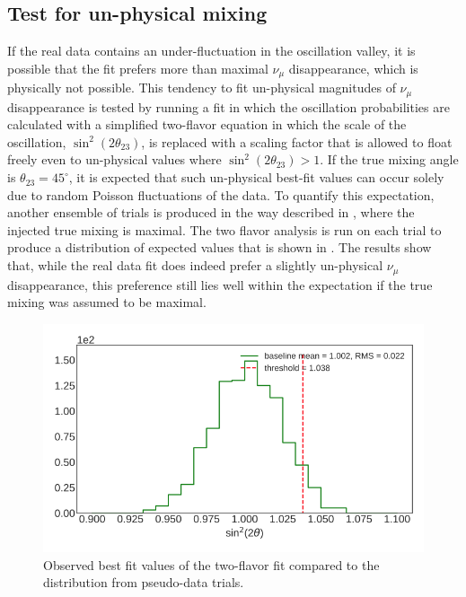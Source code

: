\subsection{Test for un-physical mixing}
If the real data contains an under-fluctuation in the oscillation valley, it is possible that the fit prefers more than maximal $\nu_\mu$ disappearance, which is physically not possible. This tendency to fit un-physical magnitudes of $\nu_\mu$ disappearance is tested by running a fit in which the oscillation probabilities are calculated with a simplified two-flavor equation in which the scale of the oscillation, $\sin^2(2\theta_{23})$, is replaced with a scaling factor that is allowed to float freely even to un-physical values where $\sin^2(2\theta_{23}) > 1$. If the true mixing angle is $\theta_{23}=45^\circ$, it is expected that such un-physical best-fit values can occur solely due to random Poisson fluctuations of the data. To quantify this expectation, another ensemble of trials is produced in the way described in , where the injected true mixing is maximal. The two flavor analysis is run on each trial to produce a distribution of expected values that is shown in . The results show that, while the real data fit does indeed prefer a slightly un-physical $\nu_\mu$ disappearance, this preference still lies well within the expectation if the true mixing was assumed to be maximal.

\begin{figure}
    \centering
    \includegraphics[width=0.8\linewidth]{figures/measurement/three_flavor/ensemble_pre_fit/two_flav_ensemble_threshold.png}
    \caption{Observed best fit values of the two-flavor fit compared to the distribution from pseudo-data trials.}
    \label{fig:two-flavor-ensemble}
\end{figure}

